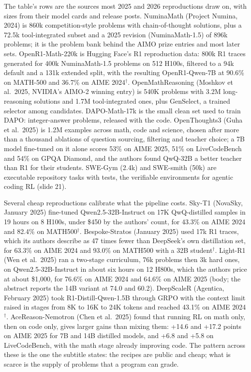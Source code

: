 \documentclass[11pt,letterpaper]{article}
\begin{document}
The table's rows are the sources most 2025 and 2026 reproductions draw on, with sizes from their model cards and release posts. NuminaMath (Project Numina, 2024) is 860k competition-style problems with chain-of-thought solutions, plus a 72.5k tool-integrated subset and a 2025 revision (NuminaMath-1.5) of 896k problems; it is the problem bank behind the AIMO prize entries and most later sets. OpenR1-Math-220k is Hugging Face's R1 reproduction data: 800k R1 traces generated for 400k NuminaMath-1.5 problems on 512 H100s, filtered to a 94k default and a 131k extended split, with the resulting OpenR1-Qwen-7B at 90.6\% on MATH-500 and 36.7\% on AIME 2024$^\dagger$. OpenMathReasoning (Moshkov et al.\ 2025, NVIDIA's AIMO-2 winning entry) is 540K problems with 3.2M long-reasoning solutions and 1.7M tool-integrated ones, plus GenSelect, a trained selector among candidates. DAPO-Math-17k is the small clean set used to train DAPO: integer-answer problems, released with the code. OpenThoughts3 (Guha et al.\ 2025) is 1.2M examples across math, code and science, chosen after more than a thousand ablations of question sourcing, filtering and teacher choice; a 7B model fine-tuned on it alone scores 53\% on AIME 2025, 51\% on LiveCodeBench and 54\% on GPQA Diamond, and the authors found QwQ-32B a better teacher than R1 for their students. SWE-Gym (2.4k) and SWE-smith (50k) are executable repository tasks with tests, the verifiable environments for agentic coding RL (slide 21).

Several cheap reproductions calibrate what the pipeline costs. Sky-T1 (NovaSky, January 2025) fine-tuned Qwen2.5-32B-Instruct on 17K QwQ-distilled samples in 19 hours on 8 H100s, under \$450 by the authors' count, for 43.3\% on AIME 2024 and 82.4\% on MATH500$^\dagger$. Bespoke-Stratos (January 2025) used 17k R1 traces, which its authors describe as 47 times fewer than DeepSeek's own distillation set, for 63.3\% on AIME 2024 and 93.0\% on MATH500 with a 32B student$^\dagger$. Light-R1 (Wen et al.\ 2025) ran a two-stage curriculum, 76k problems then 3k hard ones, on Qwen2.5-32B-Instruct in about six hours on 12 H800s, which the authors price at about \$1,000, for 76.6\% on AIME 2024 and 64.6\% on AIME 2025 (body; the abstract reports the 14B variant at 74.0 and 60.2). DeepScaleR (Agentica, February 2025) took R1-Distill-Qwen-1.5B through GRPO with the context limit raised in stages from 8K to 16K to 24K tokens and reached 43.1\% on AIME 2024$^\dagger$. AceReason-Nemotron (Chen et al.\ 2025) found that running RL on math only, then on code only, gives larger gains than mixing them: +14.6 and +17.2 points on AIME 2025 for 7B and 14B distilled models, and +6.8 and +5.8 on LiveCodeBench, with the math stage already improving code. The pattern across these is the one the subtitle states: the recipes are public and cheap; what is scarce is the supply of problems that a program can grade.
\end{document}
